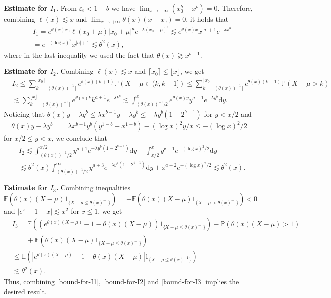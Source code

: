 \documentclass[11pt]{article}
\numberwithin{equation}{section}
\begin{document}
\noindent
{\bf Estimate for $I_1$.} From $\varepsilon_0< 1-b$ we have  $\lim_{x\to+\infty} (x_0^b - x^b )=  0$. Therefore, 
 combining $\ell(x)\lesssim x$ and $\lim_{x\to+\infty} \theta(x)(x-x_0)=  0$, it holds that 
\begin{align}\label{bound-for-I1}
	&I_1 = e^{\theta(x)x_0}\ell(x_0+\mu) |x_0+\mu|^a e^{-\lambda (x_0+\mu)^b}\lesssim e^{\theta(x)x} x^{|a|+1}e^{-\lambda x^b}\nonumber\\
	& = e^{-(\log x)^2} x^{|a|+1}\lesssim \theta^2(x),
\end{align}
where in the last inequality we used the fact that $\theta(x)\gtrsim x^{b-1}$.

\noindent
{\bf Estimate for $I_2$.} Combining $\ell(x)\lesssim x$ and $\lceil x_0 \rceil \leq \lfloor x\rfloor$, we get
\begin{align}
	& I_2 \leq \sum_{k= \lfloor (\theta(x))^{-1}\rfloor }^{\lceil x_0\rceil} e^{\theta(x)(k+1)} \mathbb{P}\left( X-\mu\in (k,k+1]\right)\leq \sum_{k= \lfloor (\theta(x))^{-1}\rfloor}^{\lceil x_0\rceil} e^{\theta(x)(k+1)} \mathbb{P}\left( X-\mu >k\right)\nonumber\\
	&\lesssim \sum_{k= \lfloor (\theta(x))^{-1}\rfloor}^{ \lfloor x\rfloor} e^{\theta(x)k} k^{a+1} e^{-\lambda k^b} \lesssim \int_{(\theta(x))^{-1}/2}^{x} e^{\theta(x) y} y^{a+1}e^{-\lambda y^b} \mathrm{d}y. 
\end{align}
Noticing that $\theta (x)y -\lambda y^b\leq  \lambda x^{b-1}y -\lambda y^b \leq -\lambda y^b(1-2^{b-1})$ for $y<x/2$ and 
\begin{align}
\theta (x)y -\lambda y^b & =  \lambda x^{b-1}y^b(y^{1-b}-x^{1-b})  - (\log x)^2 y/x  \leq - (\log x)^2 /2
\end{align}
for $x/2\leq y<x$,   we conclude that 
\begin{align}\label{bound-for-I2}
	& I_2 \lesssim \int_{(\theta(x))^{-1}/2}^{x/2}  y^{a+1}e^{-\lambda y^b(1-2^{b-1})} \mathrm{d}y  +\int_{x/2}^{x}  y^{a+1}e^{-(\log x)^2/2 } \mathrm{d}y\nonumber\\
	&\lesssim \theta^2(x)\int_{(\theta(x))^{-1}/2}^{\infty}  y^{a+3}e^{-\lambda y^b(1-2^{b-1})} \mathrm{d}y  + x^{a+2}e^{-(\log x)^2/2 } \lesssim \theta^2(x).
\end{align}

\noindent
{\bf Estimate for $I_3$.} Combining inequalities 
\[
\mathbb{E}\left(\theta(x)(X-\mu)1_{\{X-\mu\leq \theta(x)^{-1}\}}\right)=-\mathbb{E}\left(\theta(x)(X-\mu)1_{\{X-\mu> \theta(x)^{-1}\}}\right) <0
\]
and  $|e^{x}-1-x|\lesssim x^2$ for $x\leq 1$, we get 
\begin{align}\label{bound-for-I3}
	& I_3 = \mathbb{E}\left(\left(e^{\theta(x)(X-\mu)} -1-\theta(x)(X-\mu)\right)1_{\{X-\mu \leq \theta(x)^{-1}\}}\right)-\mathbb{P}(\theta(x)(X-\mu)>1)\nonumber\\
	&\qquad + \mathbb{E}\left(\theta(x)(X-\mu)1_{\{X-\mu\leq \theta(x)^{-1}\}}\right)\nonumber\\
	&\leq \mathbb{E}\left(\left|e^{\theta(x)(X-\mu)} -1-\theta(x)(X-\mu)\right|1_{\{X-\mu \leq \theta(x)^{-1}\}}\right)\nonumber\\
	&\lesssim \theta^2(x) .
\end{align}
Thus, combining \eqref{bound-for-I1}, \eqref{bound-for-I2} and \eqref{bound-for-I3} implies the desired result. 
\end{document}
